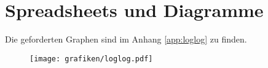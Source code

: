 \section{Spreadsheets und Diagramme}
Die geforderten Graphen sind im Anhang \ref{app:loglog} zu finden.

\begin{figure}[h!]
  \begin{center}
    \texttt{[image: grafiken/loglog.pdf]}
  \end{center}
  \caption{}
  \label{fig:loglog}
\end{figure}


